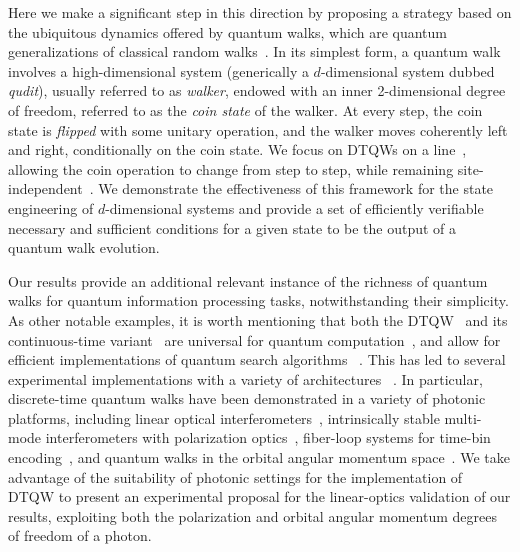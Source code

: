 Here we make a significant step in this direction by proposing a strategy based on the ubiquitous dynamics offered by quantum walks, which are quantum generalizations of classical random walks~\cite{aharonov1993quantum, nayak2000quantum, ambainis2001onedimensional, kempe2003quantum, venegasandraca2012quantum}.
In its simplest form, a quantum walk involves a high-dimensional system (generically a $d$-dimensional system dubbed \textit{qudit}), usually referred to as \emph{walker}, endowed with an inner 2-dimensional degree of freedom, referred to as the \emph{coin state} of the walker. 
At every step, the coin state is \emph{flipped} with some unitary operation, and the walker moves coherently left and right, conditionally on the coin state.
We focus on \acp{DTQW} on a line~\cite{ambainis2001onedimensional}, allowing the coin operation to change from step to step, while remaining site-independent~\cite{ribeiro2004aperiodic,wjcik2004quasiperiodic,bauls2006quantum}.
We demonstrate the effectiveness of this framework for the state engineering of $d$-dimensional systems and provide a set of efficiently verifiable necessary and sufficient conditions for a given state to be the output of a quantum walk evolution.	

Our results provide an additional relevant instance of the richness of quantum walks for quantum information processing tasks, notwithstanding their simplicity.
As other notable examples, it is worth mentioning that both the DTQW~\cite{aharonov1993quantum} and its continuous-time variant~\cite{farhi1998quantum} are universal for quantum computation~\cite{childs2009universal,childs2013universal},
and allow for efficient implementations of quantum search algorithms~%
\cite{shenvi2003quantum,ambainis2005coins,tulsi2008faster}.
This has led to several experimental implementations with a variety of architectures~%
\cite{ct2006quantum, schwartz2007transport, chandrashekar2008quantum, perets2008realization, karski2009quantum, schmitz2009quantum, zhringer2010realization, peruzzo2010quantum, owens2011twophoton, weitenberg2011singlespin, giuseppe2013einsteinpodolskyrosen, fukuhara2013microscopic, poulios2014quantum, preiss2015strongly, chapman2016experimental, caruso2016fast}.
In particular, discrete-time quantum walks have been demonstrated in a variety of photonic platforms,
including linear optical interferometers~\cite{sansoni2012twoparticle,crespi2013anderson,harris2015bosonic,pitsios2016photonic},
intrinsically stable multi-mode interferometers with polarization optics~\cite{broome2010discrete,kitagawa2012observation,vitelli2013joining},
fiber-loop systems for time-bin encoding~\cite{schreiber2010photons,schreiber2012a,boutari2016large},
and quantum walks in the orbital angular momentum space~\cite{cardano2015quantum,cardano2016statistical}.
We take advantage of the suitability of photonic settings for the implementation of DTQW to present an experimental proposal for the linear-optics validation of our results, exploiting both the polarization and orbital angular momentum degrees of freedom of a photon.

